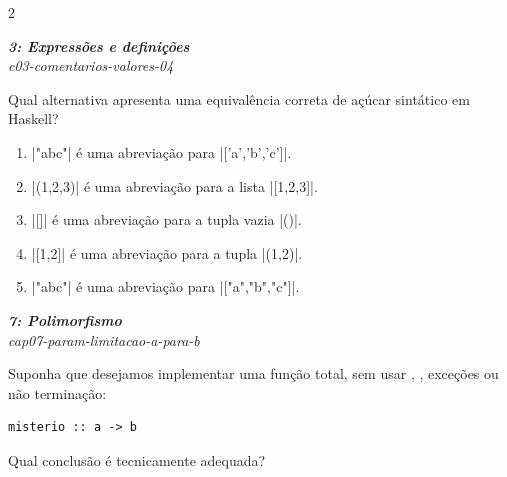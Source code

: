 \documentclass[a4paper,10pt,brazil]{article}
\begin{document}
\begin{multicols}{2}
\begin{enumerate}
\end{enumerate}

\begin{flushright}
  \footnotesize
  \textit{\textbf{3: Expressões e definições}}\\
  \textit{c03-comentarios-valores-04}\\

\end{flushright}
Qual alternativa apresenta uma equivalência correta de açúcar sintático em Haskell?

\begin{enumerate}
  \item \haskellinline|"abc"| é uma abreviação para \haskellinline|['a','b','c']|.

  \item \haskellinline|(1,2,3)| é uma abreviação para a lista \haskellinline|[1,2,3]|.

  \item \haskellinline|[]| é uma abreviação para a tupla vazia \haskellinline|()|.

  \item \haskellinline|[1,2]| é uma abreviação para a tupla \haskellinline|(1,2)|.

  \item \haskellinline|"abc"| é uma abreviação para \haskellinline|["a","b","c"]|.


\end{enumerate}

\begin{flushright}
  \footnotesize
  \textit{\textbf{7: Polimorfismo}}\\
  \textit{cap07-param-limitacao-a-para-b}\\

\end{flushright}
Suponha que desejamos implementar uma função total, sem usar , , exceções ou não terminação:

\begin{verbatim}
misterio :: a -> b
\end{verbatim}

Qual conclusão é tecnicamente adequada?


\end{multicols}
\end{document}
